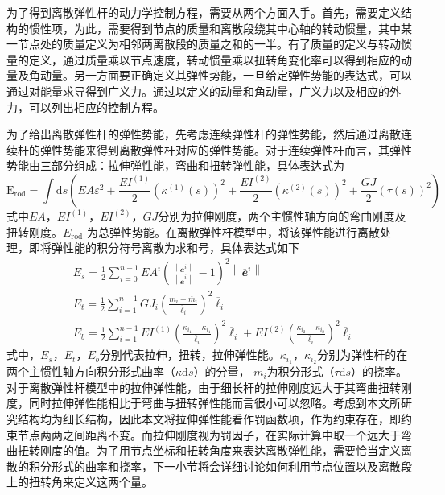 为了得到离散弹性杆的动力学控制方程，需要从两个方面入手。首先，需要定义结构的惯性项，为此，需要得到节点的质量和离散段绕其中心轴的转动惯量，其中某一节点处的质量定义为相邻两离散段的质量之和的一半。有了质量的定义与转动惯量的定义，通过质量乘以节点速度，转动惯量乘以扭转角变化率可以得到相应的动量及角动量。另一方面要正确定义其弹性势能，一旦给定弹性势能的表达式，可以通过对能量求导得到广义力。通过以定义的动量和角动量，广义力以及相应的外力，可以列出相应的控制方程。

为了给出离散弹性杆的弹性势能，先考虑连续弹性杆的弹性势能，然后通过离散连续杆的弹性势能来得到离散弹性杆对应的弹性势能。对于连续弹性杆而言，其弹性势能由三部分组成：拉伸弹性能，弯曲和扭转弹性能，具体表达式为
\begin{equation}
	\mathrm{E}_{\mathrm{rod}}=\int \mathrm{d} s\left(EA\varepsilon^2+\frac{E I^{(1)}}{2}\left(\kappa^{(1)}(s)\right)^{2}+\frac{E I^{(2)}}{2}\left(\kappa^{(2)}(s)\right)^{2}+\frac{G J}{2}(\tau(s))^{2}\right)
\end{equation}
式中$EA$，$EI^{(1)}$，$EI^{(2)}$，$G J$分别为拉伸刚度，两个主惯性轴方向的弯曲刚度及扭转刚度。$E_\mathrm{rod}$ 为总弹性势能。在离散弹性杆模型中，将该弹性能进行离散处理，即将弹性能的积分符号离散为求和号，具体表达式如下
\begin{equation}
	\begin{split}
	&E_{s}=\frac{1}{2} \sum_{i=0}^{n-1} E A^{i}\left(\frac{\left\|\mathbfit{e}^{i}\right\|}{\left\|\overline{\mathbfit{e}}^{i}\right\|}-1\right)^{2}\left\|\overline{\mathbfit{e}}^{i}\right\| \\
	&E_{t}=\frac{1}{2} \sum_{i=1}^{n-1} G J_{i} \left(\frac{m_{i}-\overline{m}_{i}}{\overline{\ell}_{i}}\right)^{2}{\overline{\ell}_{i}} \\
	&E_{b}=\frac{1}{2} \sum_{i=1}^{n-1} 
	E I^{(1)}\left(\frac{\kappa_{i_{1}}-\overline{\kappa}_{i_{1}}}{\overline{\ell}_{i}}\right)^{2}\overline{\ell}_{i}+
	E I^{(2)}\left(\frac{\kappa_{i_{2}}-\overline{\kappa}_{i_{2}}}{\overline{\ell}_{i}}\right)^{2} \overline{\ell}_{i}
\end{split}
\end{equation}
式中，$E_s$，$E_t$，$E_b$分别代表拉伸，扭转，拉伸弹性能。$\kappa_{i_1}$，$\kappa_{i_2}$分别为弹性杆的在两个主惯性轴方向积分形式曲率（$\kappa \mathrm{d}s$）的分量， $m_i$为积分形式（$\tau \mathrm{d}s$）的挠率。对于离散弹性杆模型中的拉伸弹性能，由于细长杆的拉伸刚度远大于其弯曲扭转刚度，同时拉伸弹性能相比于弯曲与扭转弹性能而言很小可以忽略\cite{audoly2000elasticity}。考虑到本文所研究结构均为细长结构，因此本文将拉伸弹性能看作罚函数项，作为约束存在，即约束节点两两之间距离不变。而拉伸刚度视为罚因子，在实际计算中取一个远大于弯曲扭转刚度的值。为了用节点坐标和扭转角度来表达离散弹性能，需要恰当定义离散的积分形式的曲率和挠率，下一小节将会详细讨论如何利用节点位置以及离散段上的扭转角来定义这两个量。

